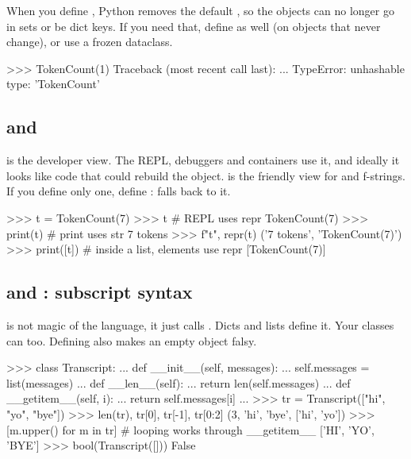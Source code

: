 \begin{trap}
When you define , Python removes the default , so the objects can no longer
go in sets or be dict keys. If you need that, define  as well (on objects that
never change), or use a frozen dataclass.
\end{trap}

\begin{pycode}
>>> {TokenCount(1)}
Traceback (most recent call last):
  ...
TypeError: unhashable type: 'TokenCount'
\end{pycode}

\subsection{ and }

 is the developer view. The REPL, debuggers and containers use it, and ideally it
looks like code that could rebuild the object.  is the friendly view for
 and f-strings. If you define only one, define :  falls
back to it.

\begin{pycode}
>>> t = TokenCount(7)
>>> t                          # REPL uses repr
TokenCount(7)
>>> print(t)                   # print uses str
7 tokens
>>> f"{t}", repr(t)
('7 tokens', 'TokenCount(7)')
>>> print([t])                 # inside a list, elements use repr
[TokenCount(7)]
\end{pycode}

\subsection{ and : subscript syntax}

 is not magic of the language, it just calls . Dicts and lists define it.
Your classes can too. Defining  also makes an empty object falsy.

\begin{pycode}
>>> class Transcript:
...     def __init__(self, messages):
...         self.messages = list(messages)
...     def __len__(self):
...         return len(self.messages)
...     def __getitem__(self, i):
...         return self.messages[i]
...
>>> tr = Transcript(["hi", "yo", "bye"])
>>> len(tr), tr[0], tr[-1], tr[0:2]
(3, 'hi', 'bye', ['hi', 'yo'])
>>> [m.upper() for m in tr]            # looping works through __getitem__
['HI', 'YO', 'BYE']
>>> bool(Transcript([]))
False
\end{pycode}

